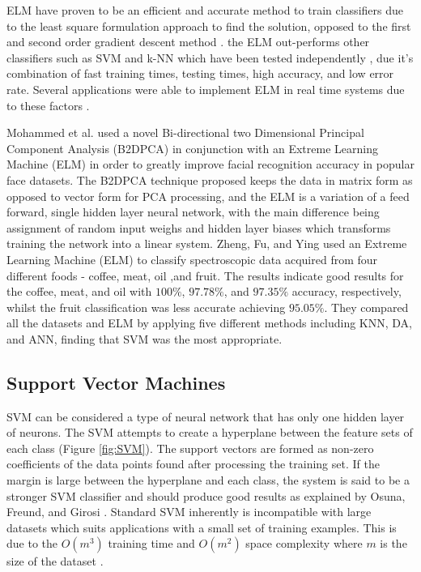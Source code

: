 \documentclass[fleqn,twoside,12pt]{report}
\begin{document}
ELM have proven to be an efficient and accurate method to train classifiers due to the least square formulation approach to find the solution, opposed to the first and second order gradient descent method \cite{yavs}. the ELM out-performs other classifiers such as SVM and k-NN which have been tested independently \cite{yavs, wan, peng}, due it's combination of fast training times, testing times, high accuracy, and low error rate. Several applications were able to implement ELM in real time systems due to these factors \cite{xu, yavs}.  

Mohammed et al.\cite{mohammed} used a novel Bi-directional two Dimensional Principal Component Analysis (B2DPCA) in conjunction with an Extreme Learning Machine (ELM) in order to greatly improve facial recognition accuracy in popular face datasets. The B2DPCA technique proposed keeps the data in matrix form as opposed to vector form for PCA processing, and the ELM is a variation of a feed forward, single hidden layer neural network, with the main difference being assignment of random input weighs and hidden layer biases which transforms training the network into a linear system. Zheng, Fu, and Ying \cite{zheng} used an Extreme Learning Machine (ELM) to classify spectroscopic data acquired from four different foods - coffee, meat, oil ,and fruit. The results indicate good results for the coffee, meat, and oil with $100\%$, $97.78\%$, and $97.35\%$ accuracy, respectively, whilst the fruit classification was less accurate achieving $95.05\%$. They compared all the datasets and ELM by applying five different methods including KNN, DA, and ANN, finding that SVM was the most appropriate. 


\subsection{Support Vector Machines}


SVM can be considered a type of neural network that has only one hidden layer of neurons. The SVM attempts to create a hyperplane between the feature sets of each class (Figure \ref{fig:SVM}). The support vectors are formed as non-zero coefficients of the data points found after processing the training set. If the margin is large between the hyperplane and each class, the system is said to be a stronger SVM classifier and should produce good results as explained by Osuna, Freund, and Girosi \cite{osuna}. Standard SVM inherently is incompatible with large datasets which suits applications with a small set of training examples. This is due to the $O(m^3)$ training time and $O(m^2)$ space complexity where $m$ is the size of the dataset \cite{tsang}.
\end{document}
